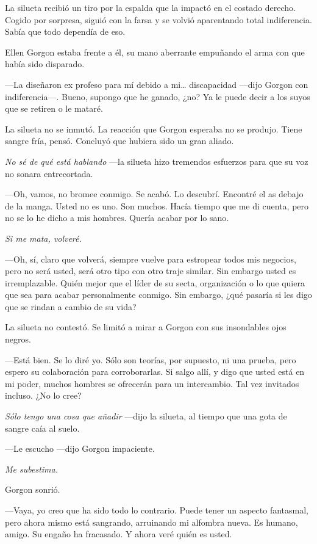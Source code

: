 La silueta recibió un tiro por la espalda que la impactó en el costado derecho. Cogido por sorpresa, siguió con la farsa y se volvió aparentando total indiferencia. Sabía que todo dependía de eso.

Ellen Gorgon estaba frente a él, su mano aberrante empuñando el arma con que había sido disparado.

---La diseñaron ex profeso para mí debido a mi\dots{} discapacidad ---dijo Gorgon con indiferencia---. Bueno, supongo que he ganado, ¿no? Ya le puede decir a los suyos que se retiren o le mataré.

La silueta no se inmutó. La reacción que Gorgon esperaba no se produjo. Tiene sangre fría, pensó. Concluyó que hubiera sido un gran aliado.

\emph{No sé de qué está hablando} ---la silueta hizo tremendos esfuerzos para que su voz no sonara entrecortada.

---Oh, vamos, no bromee conmigo. Se acabó. Lo descubrí. Encontré el as debajo de la manga. Usted no es uno. Son muchos. Hacía tiempo que me di cuenta, pero no se lo he dicho a mis hombres. Quería acabar por lo sano.

\emph{Si me mata, volveré.}

---Oh, sí, claro que volverá, siempre vuelve para estropear todos mis negocios, pero no será usted, será otro tipo con otro traje similar. Sin embargo usted es irremplazable. Quién mejor que el líder de su secta, organización o lo que quiera que sea para acabar personalmente conmigo. Sin embargo, ¿qué pasaría si les digo que se rindan a cambio de su vida?

La silueta no contestó. Se limitó a mirar a Gorgon con sus insondables ojos negros.

---Está bien. Se lo diré yo. Sólo son teorías, por supuesto, ni una prueba, pero espero su colaboración para corroborarlas. Si salgo allí, y digo que usted está en mi poder, muchos hombres se ofrecerán para un intercambio. Tal vez invitados incluso. ¿No lo cree?

\emph{Sólo tengo una cosa que añadir} ---dijo la silueta, al tiempo que una gota de sangre caía al suelo.

---Le escucho ---dijo Gorgon impaciente.

\emph{Me subestima.}

Gorgon sonrió.

---Vaya, yo creo que ha sido todo lo contrario. Puede tener un aspecto fantasmal, pero ahora mismo está sangrando, arruinando mi alfombra nueva. Es humano, amigo. Su engaño ha fracasado. Y ahora veré quién es usted.

